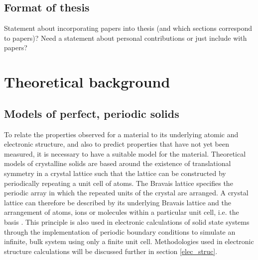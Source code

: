 \documentclass[11pt, twoside]{report}
\begin{document}
\section{Format of thesis}
Statement about incorporating papers into thesis (and which sections correspond to papers)? Need a statement about personal contributions or just include with papers?

\chapter{Theoretical background} 

\section{Models of perfect, periodic solids}\label{crystal_models}
To relate the properties observed for a material to its underlying atomic and electronic structure, and also to predict properties that have not yet been measured, it is necessary to have a suitable model for the material. Theoretical models of crystalline solids are based around the existence of translational symmetry in a crystal lattice such that the lattice can be constructed by periodically repeating a unit cell of atoms. The Bravais lattice specifies the periodic array in which the repeated units of the crystal are arranged. A crystal lattice can therefore be described by its underlying Bravais lattice and the arrangement of atoms, ions or molecules within a particular unit cell, i.e. the basis \cite{AshcroftMermin2}. This principle is also used in electronic calculations of solid state systems through the implementation of periodic boundary conditions to simulate an infinite, bulk system using only a finite unit cell. Methodologies used in electronic structure calculations will be discussed further in section \ref{elec_struc}.
 
\end{document}
